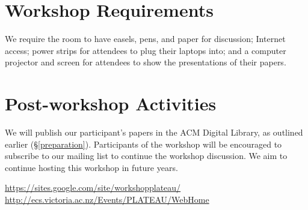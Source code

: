 \documentclass{sigplanconf}
\begin{document}
\section{Workshop Requirements}

We require the room to have easels, pens, and paper for discussion; 
Internet access; power strips for attendees to plug their laptops into; and a computer projector and
screen for attendees to show the presentations of their
papers.


\section{Post-workshop Activities}

We will publish our participant's papers in the ACM Digital Library, as outlined earlier (\S \ref{preparation}). Participants of the workshop will be encouraged to subscribe to our mailing list to continue the workshop discussion. We aim to continue hosting this workshop in future years.

\begin{thebibliography}{1}
 \url{https://sites.google.com/site/workshopplateau/}
\url{http://ecs.victoria.ac.nz/Events/PLATEAU/WebHome}
\end{thebibliography}
\end{document}
